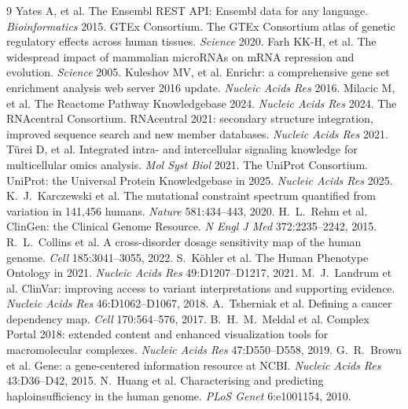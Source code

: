 \documentclass[11pt]{article}
\begin{document}
\begin{thebibliography}{9}
 Yates A, et al. The Ensembl REST API: Ensembl data for any language. \emph{Bioinformatics} 2015.
 GTEx Consortium. The GTEx Consortium atlas of genetic regulatory effects across human tissues. \emph{Science} 2020.
 Farh KK-H, et al. The widespread impact of mammalian microRNAs on mRNA repression and evolution. \emph{Science} 2005.
 Kuleshov MV, et al. Enrichr: a comprehensive gene set enrichment analysis web server 2016 update. \emph{Nucleic Acids Res} 2016.
 Milacic M, et al. The Reactome Pathway Knowledgebase 2024. \emph{Nucleic Acids Res} 2024.
 The RNAcentral Consortium. RNAcentral 2021: secondary structure integration, improved sequence search and new member databases. \emph{Nucleic Acids Res} 2021.
 T\"urei D, et al. Integrated intra- and intercellular signaling knowledge for multicellular omics analysis. \emph{Mol Syst Biol} 2021.
 The UniProt Consortium. UniProt: the Universal Protein Knowledgebase in 2025. \emph{Nucleic Acids Res} 2025.
 K.~J.~Karczewski et al. The mutational constraint spectrum quantified from variation in 141,456 humans. \emph{Nature} 581:434--443, 2020.
 H.~L.~Rehm et al. ClinGen: the Clinical Genome Resource. \emph{N Engl J Med} 372:2235--2242, 2015.
 R.~L.~Collins et al. A cross-disorder dosage sensitivity map of the human genome. \emph{Cell} 185:3041--3055, 2022.
 S.~K\"ohler et al. The Human Phenotype Ontology in 2021. \emph{Nucleic Acids Res} 49:D1207--D1217, 2021.
 M.~J.~Landrum et al. ClinVar: improving access to variant interpretations and supporting evidence. \emph{Nucleic Acids Res} 46:D1062--D1067, 2018.
 A.~Tsherniak et al. Defining a cancer dependency map. \emph{Cell} 170:564--576, 2017.
 B.~H.~M.~Meldal et al. Complex Portal 2018: extended content and enhanced visualization tools for macromolecular complexes. \emph{Nucleic Acids Res} 47:D550--D558, 2019.
 G.~R.~Brown et al. Gene: a gene-centered information resource at NCBI. \emph{Nucleic Acids Res} 43:D36--D42, 2015.
 N.~Huang et al. Characterising and predicting haploinsufficiency in the human genome. \emph{PLoS Genet} 6:e1001154, 2010.

\end{thebibliography}
\end{document}
